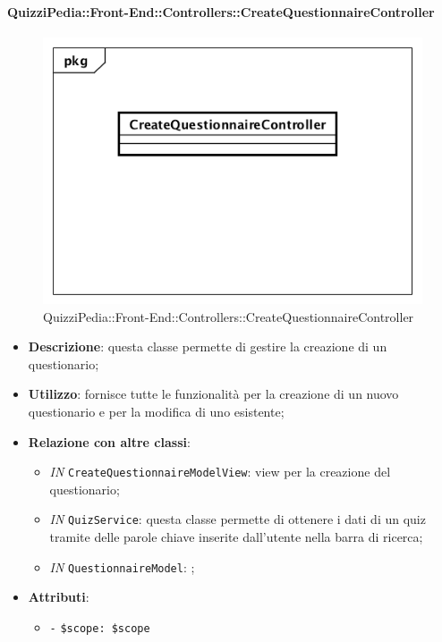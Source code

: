 \begin{itemize}
\paragraph{QuizziPedia::Front-End::Controllers::CreateQuestionnaireController}
\begin{figure} [ht]
	\centering
	\includegraphics[scale=0.45]{UML/Classi/Front-End/QuizziPedia_Front-end_Controller_CreateQuestionnaireController.png}
	\caption{QuizziPedia::Front-End::Controllers::CreateQuestionnaireController}
\end{figure} \FloatBarrier
\begin{itemize}
	\item \textbf{Descrizione}: questa classe permette di gestire la creazione di un questionario;
	\item \textbf{Utilizzo}: fornisce tutte le funzionalità per la creazione di un nuovo questionario e per la modifica di uno esistente;
	\item \textbf{Relazione con altre classi}:
	\begin{itemize}
		\item \textit{IN} \texttt{CreateQuestionnaireModelView}: view per la creazione del questionario; 
		\item \textit{IN} \texttt{QuizService}: questa classe permette di ottenere i dati di un quiz tramite delle parole chiave inserite dall'utente nella barra di ricerca;
		\item \textit{IN} \texttt{QuestionnaireModel}: ;
	\end{itemize}
	\item \textbf{Attributi}:
	\begin{itemize}
		\item \texttt{-} \texttt{\$scope: \$scope} \\

\end{itemize}
\end{itemize}
\end{itemize}
